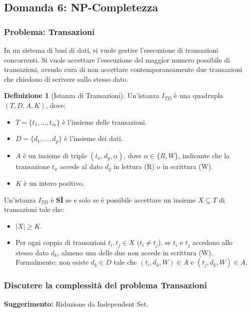 \documentclass[a4paper]{article}
\theoremstyle{definition} %
\newtheorem{definition}{Definizione}
\begin{document}
\subsection{Domanda 6: NP-Completezza}
\subsubsection{Problema: Transazioni}
In un sistema di basi di dati, si vuole gestire l'esecuzione di transazioni concorrenti. Si vuole accettare l'esecuzione del maggior numero possibile di transazioni, avendo cura di non accettare contemporaneamente due transazioni che chiedono di scrivere sullo stesso dato.

\begin{definition}[Istanza di Transazioni]
Un'istanza $I_{TD}$ è una quadrupla $(T, D, A, K)$, dove:
\begin{itemize}
    \item $T = \{t_1, \dots, t_m\}$ è l'insieme delle transazioni.
    \item $D = \{d_1, \dots, d_p\}$ è l'insieme dei dati.
    \item $A$ è un insieme di triple $(t_x, d_y, \alpha)$, dove $\alpha \in \{R, W\}$, indicante che la transazione $t_x$ accede al dato $d_y$ in lettura (R) o in scrittura (W).
    \item $K$ è un intero positivo.
\end{itemize}
Un'istanza $I_{TD}$ è \textbf{SÌ} se e solo se è possibile accettare un insieme $X \subseteq T$ di transazioni tale che:
\begin{itemize}
    \item $|X| \ge K$.
    \item Per ogni coppia di transazioni $t_i, t_j \in X$ ($t_i \neq t_j$), se $t_i$ e $t_j$ accedono allo stesso dato $d_k$, almeno una delle due non accede in scrittura (W). Formalmente: non esiste $d_k \in D$ tale che $(t_i, d_k, W) \in A$ e $(t_j, d_k, W) \in A$.
\end{itemize}
\end{definition}

\subsubsection{Discutere la complessità del problema Transazioni}
\textbf{Suggerimento:} Riduzione da Independent Set.
\end{document}
